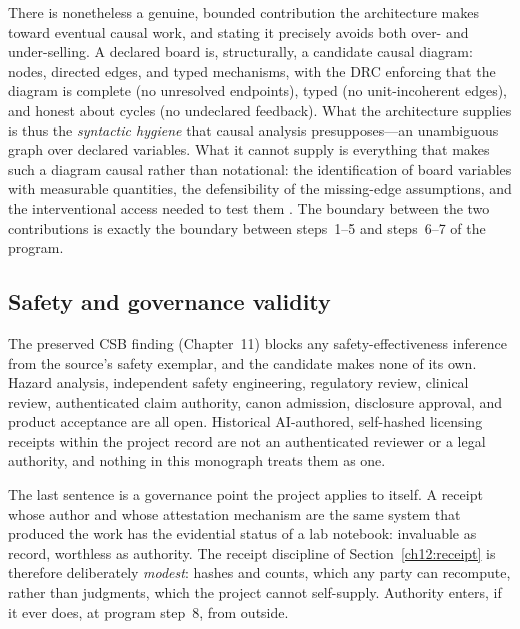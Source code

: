 There is nonetheless a genuine, bounded contribution the architecture makes toward eventual causal work, and stating it precisely avoids both over- and under-selling. A declared board is, structurally, a candidate causal diagram: nodes, directed edges, and typed mechanisms, with the DRC enforcing that the diagram is complete (no unresolved endpoints), typed (no unit-incoherent edges), and honest about cycles (no undeclared feedback). What the architecture supplies is thus the \emph{syntactic hygiene} that causal analysis presupposes---an unambiguous graph over declared variables. What it cannot supply is everything that makes such a diagram causal rather than notational: the identification of board variables with measurable quantities, the defensibility of the missing-edge assumptions, and the interventional access needed to test them \cite{pearl}. The boundary between the two contributions is exactly the boundary between steps~1--5 and steps~6--7 of the program.

\subsection{Safety and governance validity}\label{ch12:threats-safety}

\begin{threat}\label{ch12:threat-safety}
The preserved CSB finding (Chapter~11) blocks any safety-effectiveness inference from the source's safety exemplar, and the candidate makes none of its own. Hazard analysis, independent safety engineering, regulatory review, clinical review, authenticated claim authority, canon admission, disclosure approval, and product acceptance are all open. Historical AI-authored, self-hashed licensing receipts within the project record are not an authenticated reviewer or a legal authority, and nothing in this monograph treats them as one.
\end{threat}

The last sentence is a governance point the project applies to itself. A receipt whose author and whose attestation mechanism are the same system that produced the work has the evidential status of a lab notebook: invaluable as record, worthless as authority. The receipt discipline of Section~\ref{ch12:receipt} is therefore deliberately \emph{modest}: hashes and counts, which any party can recompute, rather than judgments, which the project cannot self-supply. Authority enters, if it ever does, at program step~8, from outside.

